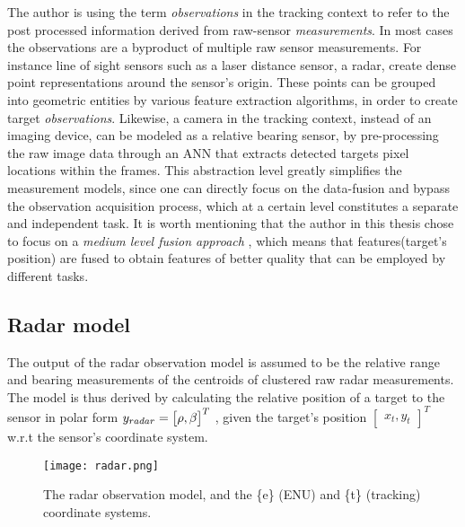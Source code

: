 The author is using the term \emph{observations} in the tracking context to refer to the post processed information derived from raw-sensor \emph{measurements}. In most cases the observations are a byproduct of multiple raw sensor measurements. For instance line of sight sensors such as a laser distance sensor, a radar, create dense point representations around the sensor's origin. These points can be grouped into geometric entities by various feature extraction algorithms, in order to create target \emph{observations}.  Likewise, a camera in the tracking context, instead of an imaging device, can be modeled as a relative bearing sensor, by pre-processing the raw image data through an ANN that extracts detected targets pixel locations within the frames. This abstraction level greatly simplifies the measurement models, since one can directly focus on the data-fusion and bypass the observation acquisition process, which at a certain level constitutes a separate and independent task. It is worth mentioning that the author in this thesis chose to focus on a \emph{medium level fusion approach} \cite{Luo2002}, which means that features(target's position) are fused to obtain features of better quality that can be employed by different tasks.





\subsection{Radar model}

The output of the radar observation model is assumed to be the relative range and bearing measurements of the centroids of clustered raw radar measurements. The model is thus derived by calculating the relative position of a target to the sensor in polar form ${{y}}_{radar} = \begin{bmatrix}
{\rho},
{\beta}
\end{bmatrix}^{T}$ , given the target's position $\begin{bmatrix}x_t, y_t\end{bmatrix}^{T}$ w.r.t the sensor's coordinate system.

\begin{figure}[H]
	\centering
	\texttt{[image: radar.png]}
	\caption{The radar observation model, and the \{e\} (ENU) and \{t\} (tracking) coordinate systems.}
	\label{fig:radar_observation_model}
\end{figure}


